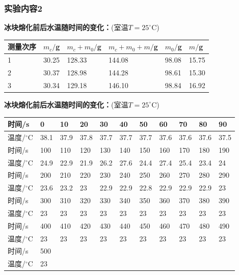 \documentclass[dvipsnames, svgnames,a4paper,11pt]{article}
\begin{document}
\subsubsection{实验内容2}
{\bf 冰块熔化前后水温随时间的变化：}(室温$T=25^\circ$C)
\begin{table}[!h]
	\renewcommand\arraystretch{1.7}
	\centering
	\begin{tabularx}{\textwidth}{|X|X|X|X|X|X|}
	\hline
	测量次序& $m_c/$g &$m_c+m_0/$g& $m_c+m_0+m/$g&$m_0/$g&$m/$g \\
	\hline
	1&30.25&128.33&144.08&98.08&15.75\\
	\hline
	2&30.37&128.98&144.28&98.61&15.30\\
	\hline
	3&30.34&129.18&146.10&98.84&16.92\\
	\hline
	\end{tabularx}
\end{table}\par
{\bf 冰块熔化前后水温随时间的变化：}(室温$T=25^\circ$C)
\begin{table}[!h]
    \centering
    \begin{tabular}{|l|l|l|l|l|l|l|l|l|l|l|}
    \hline
	时间/s & 0 & 10 & 20 & 30 & 40 & 50 & 60 & 70 & 80 & 90 \\ \hline
	温度/$^\circ$C & 38.1 & 37.9 & 37.8 & 37.7 & 37.7 & 37.7 & 37.6 & 37.6 & 37.6 & 37.5 \\ \hline
		时间/s & 100 & 110 & 120 & 130 & 140 & 150 & 160 & 170 & 180 & 190 \\ \hline
        温度/$^\circ$C & 24.9 & 22.9 & 21.9 & 26.2 & 27.6 & 24.4 & 27.4 & 25.4 & 23.4 & 24 \\ \hline
		时间/s & 200 & 210 & 220 & 230 & 240 & 250 & 260 & 270 & 280 & 290 \\ \hline
		温度/$^\circ$C & 23.6 & 23.2 & 23 & 22.9 & 22.9 & 22.8 & 22.9 & 22.9 & 22.9 & 23 \\ \hline
		时间/s& 300 & 310 & 320 & 330 & 340 & 350 & 360 & 370 & 380 & 390 \\ \hline
        温度/$^\circ$C & 23 & 23 & 23 & 23 & 23 & 23 & 23 & 23 & 23 & 23 \\ \hline
		时间/s & 400 & 410 & 420 & 430 & 440 & 450 & 460 & 470 & 480 & 490 \\ \hline
        温度/$^\circ$C & 23 & 23 & 23 & 23 & 23 & 23 & 23 & 23 & 23 & 23 \\ \hline
		时间/s& 500 & ~ & ~ & ~ & ~ & ~ & ~ & ~ & ~ & ~ \\ \hline
        温度/$^\circ$C & 23 & ~ & ~ & ~ & ~ & ~ & ~ & ~ & ~ & ~ \\ \hline
    \end{tabular}
\end{table}\newpage
\end{document}
